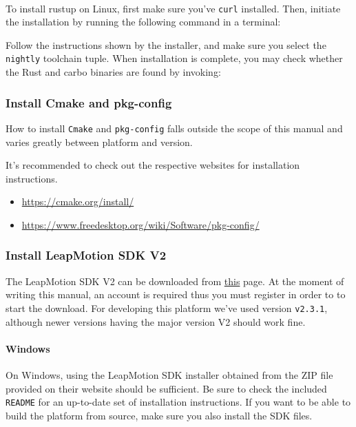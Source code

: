 \documentclass{standalone}
\begin{document}
  \paragraph{}
  To install rustup on Linux, first make sure you've \verb_curl_ installed.
  Then, initiate the installation by running the following command in a
  terminal:
  
  Follow the instructions shown by the installer, and make sure you select the
  \verb_nightly_ toolchain tuple. When installation is complete, you may check
  whether the Rust and carbo binaries are found by invoking:
  

  \subsubsection{Install Cmake and pkg-config}
  How to install \verb_Cmake_ and \verb_pkg-config_ falls outside the scope of
  this manual and varies greatly between platform and version.

  It's recommended to check out the respective websites for installation
  instructions.
  \begin{itemize}
    \tightlist{}
    \item \url{https://cmake.org/install/}
    \item \url{https://www.freedesktop.org/wiki/Software/pkg-config/}
  \end{itemize}

  \subsubsection{Install LeapMotion SDK V2}
  The LeapMotion SDK V2 can be downloaded from
  \href{https://developer.leapmotion.com/sdk/v2}{this} page. At the moment of
  writing this manual, an account is required thus you must register in order
  to to start the download. For developing this platform we've used version
  \verb_v2.3.1_, although newer versions having the major version V2 should work
  fine.

  \paragraph{Windows}
  On Windows, using the LeapMotion SDK installer obtained from the ZIP file
  provided on their website should be sufficient. Be sure to check the included
  \verb_README_ for an up-to-date set of installation instructions. If you
  want to be able to build the platform from source, make sure you also install
  the SDK files.
\end{document}
